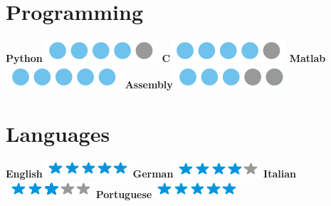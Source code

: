 \documentclass[]{friggeri-cv}
\begin{document}
\begin{aside}
	\section{Programming}
	    \textbf{Python}\includegraphics[scale=0.38]{img/4bubbles.png}
	    \textbf{C}\includegraphics[scale=0.38]{img/4bubbles.png}
	    \textbf{Matlab}\includegraphics[scale=0.38]{img/5bubbles.png}
	    \textbf{Assembly}\includegraphics[scale=0.38]{img/3bubbles.png}
	    ~
	\section{Languages}
	    \textbf{English}\includegraphics[scale=0.40]{img/5stars.png}
	    \textbf{German}\includegraphics[scale=0.40]{img/4stars.png}
	    \textbf{Italian}\includegraphics[scale=0.40]{img/3stars.png}
	    \textbf{Portuguese}\includegraphics[scale=0.40]{img/5stars.png}
	    ~

\end{aside}
\end{document}
